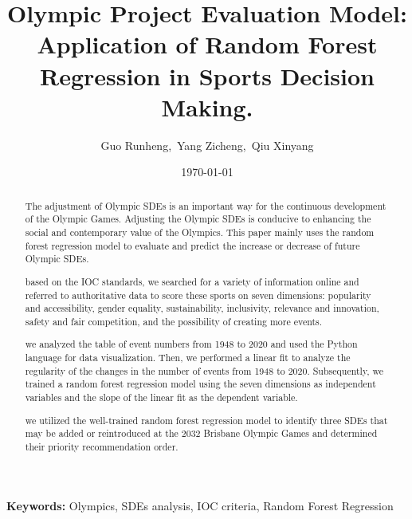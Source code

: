 \documentclass[a4paper]{article}
\title{\textbf{Olympic Project Evaluation Model: Application of Random Forest Regression in Sports Decision Making.}}
\author{ Guo Runheng,\ Yang Zicheng,\ Qiu Xinyang}
\date{\today}
\newcommand{\keywords}[1]{\par\noindent\textbf{Keywords:} #1}
\begin{document}
    \maketitle
\begin{abstract}
    The adjustment of Olympic SDEs is an important way for the continuous development of the Olympic Games. Adjusting the Olympic SDEs is conducive to enhancing the social and contemporary value of the Olympics. This paper mainly uses the random forest regression model to evaluate and predict the increase or decrease of future Olympic SDEs.
    \par based on the IOC standards, we searched for a variety of information online and referred to authoritative data to score these sports on seven dimensions: popularity and accessibility, gender equality, sustainability, inclusivity, relevance and innovation, safety and fair competition, and the possibility of creating more events.
    \par we analyzed the table of event numbers from 1948 to 2020 and used the Python language for data visualization. Then, we performed a linear fit to analyze the regularity of the changes in the number of events from 1948 to 2020. Subsequently, we trained a random forest regression model using the seven dimensions as independent variables and the slope of the linear fit as the dependent variable.
    \par we utilized the well-trained random forest regression model to identify three SDEs that may be added or reintroduced at the 2032 Brisbane Olympic Games and determined their priority recommendation order.
\end{abstract}
\keywords{Olympics, SDEs analysis, IOC criteria, Random Forest Regression}
\end{document}
